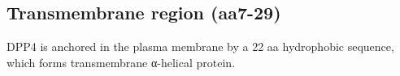 \subsection{Transmembrane region (aa7-29)}

DPP4 is anchored in the plasma membrane by a 22 aa hydrophobic sequence, which forms \alphapolytopic transmembrane α-helical protein. \cite{Hong_1990}